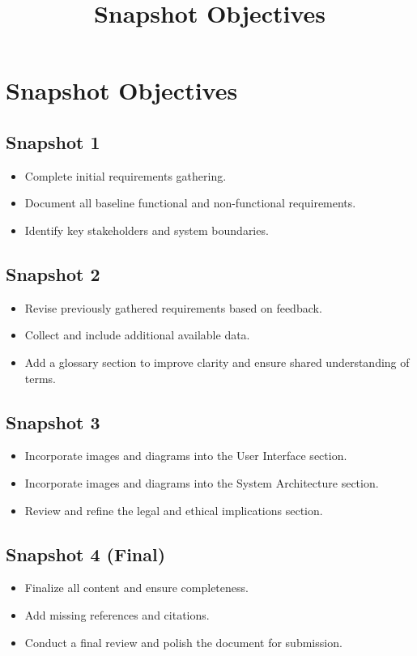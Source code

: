\documentclass{article}
\title{Snapshot Objectives}
\date{}
\begin{document}
\maketitle

\section*{Snapshot Objectives}

\subsection*{Snapshot 1}
\begin{itemize}
    \item Complete initial requirements gathering.
    \item Document all baseline functional and non-functional requirements.
    \item Identify key stakeholders and system boundaries.
\end{itemize}

\subsection*{Snapshot 2}
\begin{itemize}
    \item Revise previously gathered requirements based on feedback.
    \item Collect and include additional available data.
    \item Add a glossary section to improve clarity and ensure shared understanding of terms.
\end{itemize}

\subsection*{Snapshot 3}
\begin{itemize}
    \item Incorporate images and diagrams into the User Interface section.
    \item Incorporate images and diagrams into the System Architecture section.
    \item Review and refine the legal and ethical implications section.
\end{itemize}

\subsection*{Snapshot 4 (Final)}
\begin{itemize}
    \item Finalize all content and ensure completeness.
    \item Add missing references and citations.
    \item Conduct a final review and polish the document for submission.
\end{itemize}
\end{document}

